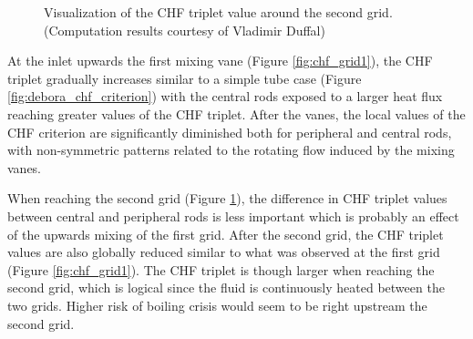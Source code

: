 \begin{figure}[!h]
\caption{Visualization of the CHF triplet value around the second grid. (Computation results courtesy of Vladimir Duffal)}
\label{fig:chf_grid2}
\end{figure}

\npar
At the inlet upwards the first mixing vane (Figure \ref{fig:chf_grid1}), the CHF triplet gradually increases similar to a simple tube case (Figure \ref{fig:debora_chf_criterion}) with the central rods exposed to a larger heat flux reaching greater values of the CHF triplet. After the vanes, the local values of the CHF criterion are significantly diminished both for peripheral and central rods, with non-symmetric patterns related to the rotating flow induced by the mixing vanes.



\npar 
When reaching the second grid (Figure \ref{fig:chf_grid2}), the difference in CHF triplet values between central and peripheral rods is less important which is probably an effect of the upwards mixing of the first grid. After the second grid, the CHF triplet values are also globally reduced similar to what was observed at the first grid (Figure \ref{fig:chf_grid1}). The CHF triplet is though larger when reaching the second grid, which is logical since the fluid is continuously heated between the two grids. Higher risk of boiling crisis would seem to be right upstream the second grid.

